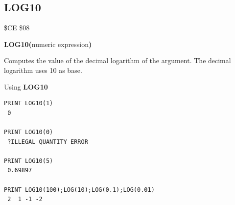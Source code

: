 \subsection{LOG10}
\begin{description}[leftmargin=2cm,style=nextline]
\item [Token:] \$CE \$08
\item [Format:] {\bf LOG10(}numeric expression{\bf)}
\item [Usage:] Computes
               the value of the decimal logarithm of the argument.
               The decimal logarithm uses 10 as base.

\item [Example:] Using {\bf LOG10}
\begin{tcolorbox}[colback=black,coltext=white]
\verbatimfont{\codefont}
\begin{verbatim}
PRINT LOG10(1)
 0

PRINT LOG10(0)
 ?ILLEGAL QUANTITY ERROR

PRINT LOG10(5)
 0.69897

PRINT LOG10(100);LOG(10);LOG(0.1);LOG(0.01)
 2  1 -1 -2
\end{verbatim}
\end{tcolorbox}
\end{description}


\newpage

